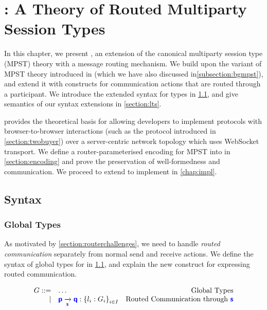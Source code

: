 \chapter{\newtheory: A Theory of
Routed Multiparty Session Types}
\label{chap:theory}

In this chapter, we present
\newtheory, an extension of the
canonical multiparty session type (MPST)
theory with a message routing mechanism.
We build upon the variant of MPST theory introduced
in \cite{LessIsMore}
(which we have also discussed in\cref{subsection:bgmpst}), 
and extend it
with constructs for communication actions
that are routed through a participant.
We introduce the extended syntax for types in 
\cref{section:syntax}, and give semantics of our
syntax extensions in \cref{section:lts}.

\newtheory provides the theoretical basis
for allowing developers to implement
protocols with browser-to-browser interactions
(such as the  protocol
introduced in \cref{section:twobuyer})
over a server-centric network topology
which uses WebSocket transport.
We define a router-parameterised encoding
for MPST into \newtheory in \cref{section:encoding}
and prove the preservation of well-formedness
and communication.
We proceed to extend \codegen to implement \newtheory
in \cref{chap:impl}.

\section{Syntax}
\label{section:syntax}

\subsection{Global Types}
As motivated by \ref{section:routerchallenges},
we need to handle \textit{routed communication} separately
from normal send and receive actions.
We define the syntax of global types for \newtheory 
in \cref{fig:newsyntaxglobal}, and explain the 
new construct for expressing routed communication.

\begin{figure}[!h]
\doublespacing
\[
\begin{array}{rlr}
G ::= & \dots & \text{Global Types} \\
\mid & \groute{p}{q}{s}{l_i: G_i}{i \in I}
& \text{Routed Communication through $\role{s}$} \\
\end{array}
\]
\singlespacing
{}
\label{fig:newsyntaxglobal}
\end{figure}

